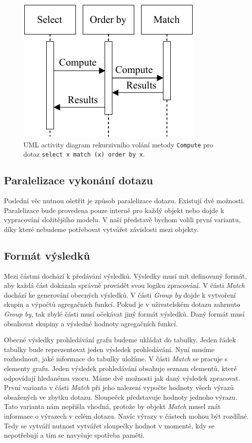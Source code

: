 \begin{figure}[!htp]
\includegraphics{../img/diaQueryObjectsCall.pdf}\centering
\caption{UML activity diagram rekurzivního volání metody \texttt{Compute} pro dotaz \texttt{select x match (x) order by x}.}
\label{figure.diaQueryObjectsCall}
\end{figure}

\clearpage

\subsection{Paralelizace vykonání dotazu}

Poslední věc nutnou ošetřit je způsob paralelizace dotazu.
Existují dvě možnosti.
Paralelizace bude provedena pouze interně pro každý objekt nebo dojde k vypracování složitějšího modelu.
V naší představě bychom volili první variantu, díky které nebudeme potřebovat vytvářet závislosti mezi objekty.

\subsection{Formát výsledků} \label{anal.tables}

Mezi částmi dochází k předávání výsledků.
Výsledky musí mít definovaný formát, aby každá část dokázala správně provádět svou logiku zpracování.
V části \textit{Match} dochází ke generování obecných výsledků.
V části \textit{Group by} dojde k vytvoření skupin a výpočtů agregačních funkcí.
Pokud je v uživatelském dotazu zahrnuto \textit{Group by}, tak zbylé části musí očekávat jiný formát výsledků.
Daný formát musí obsahovat skupiny a výsledné hodnoty agregačních funkcí.

Obecné výsledky prohledávání grafu budeme ukládat do tabulky.
Jeden řádek tabulky bude reprezentovat jeden výsledek prohledávání.
Nyní musíme rozhodnout, jaké informace do tabulky uložíme.
V části \textit{Match} se pracuje s elementy grafu.
Jeden výsledek prohledávání obsahuje seznam elementů, které odpovídají hledanému vzoru.
Máme dvě možnosti jak daný výsledek zpracovat.
První varianta v části \textit{Match} při jeho nalezení vypočte hodnoty všech výrazů obsažených ve zbytku dotazu.
Sloupeček představuje hodnoty jednoho výrazu.
Tato varianta nám nepřišla vhodná, protože by objekt \textit{Match} musel znát informace o výrazech v celém dotazu.
Navíc výrazy v částech mohou být rozdílné.
Tedy se vytváří nutnost vytvářet sloupečky hodnot v momentě, kdy se nepotřebují a tím se navyšuje spotřeba paměti.

